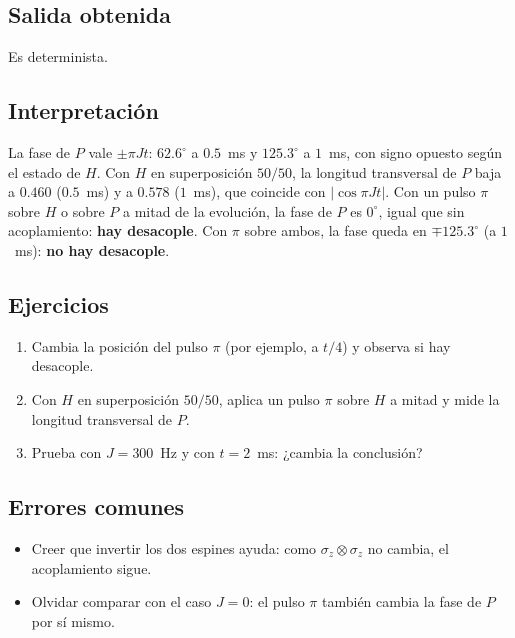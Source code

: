 \subsection{Salida obtenida}

Es determinista.

\subsection{Interpretación}
La fase de $P$ vale $\pm\pi Jt$: $62.6^\circ$ a $0.5$~ms y $125.3^\circ$ a $1$~ms,
con signo opuesto según el estado de $H$. Con $H$ en superposición $50/50$, la
longitud transversal de $P$ baja a $0.460$ ($0.5$~ms) y a $0.578$ ($1$~ms),
que coincide con $|\cos\pi Jt|$. Con un pulso $\pi$ sobre $H$ o sobre $P$ a
mitad de la evolución, la fase de $P$ es $0^\circ$, igual que sin acoplamiento:
\textbf{hay desacople}. Con $\pi$ sobre ambos, la fase queda en $\mp125.3^\circ$
(a $1$~ms): \textbf{no hay desacople}.

\subsection{Ejercicios}
\begin{enumerate}
  \item Cambia la posición del pulso $\pi$ (por ejemplo, a $t/4$) y observa si
    hay desacople.
  \item Con $H$ en superposición $50/50$, aplica un pulso $\pi$ sobre $H$ a mitad
    y mide la longitud transversal de $P$.
  \item Prueba con $J=300$~Hz y con $t=2$~ms: ¿cambia la conclusión?
\end{enumerate}

\subsection{Errores comunes}
\begin{itemize}
  \item Creer que invertir los dos espines ayuda: como $\sigma_z\otimes\sigma_z$
    no cambia, el acoplamiento sigue.
  \item Olvidar comparar con el caso $J=0$: el pulso $\pi$ también cambia la
    fase de $P$ por sí mismo.
\end{itemize}


